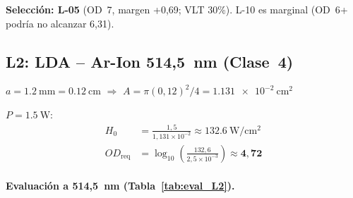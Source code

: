 \documentclass[12pt,a4paper]{article}
\begin{document}
\textbf{Selección: L-05} (OD~7, margen +0,69; VLT 30\%).
L-10 es marginal (OD~6+ podría no alcanzar 6,31).

\subsection{L2: LDA -- Ar-Ion 514,5~nm (Clase~4)}

$a = \SI{1.2}{\mm} = \SI{0.12}{\cm}$ $\Rightarrow$
$A = \pi(0{,}12)^2/4 = \SI{1.131e-2}{\centi\metre\squared}$

$P = \SI{1.5}{\watt}$:
\begin{align}
	H_0               & = \frac{1{,}5}{1{,}131\times10^{-2}} \approx \SI{132.6}{\watt\per\centi\metre\squared}
	\label{eq:H0_L2}                                                                                           \\
	OD_{\mathrm{req}} & = \log_{10}\!\left(\frac{132{,}6}{2{,}5\times10^{-3}}\right)
	\approx \mathbf{4{,}72}
	\label{eq:OD_L2}
\end{align}

\paragraph{Evaluación a 514,5~nm (Tabla~\ref{tab:eval_L2}).}
\end{document}
